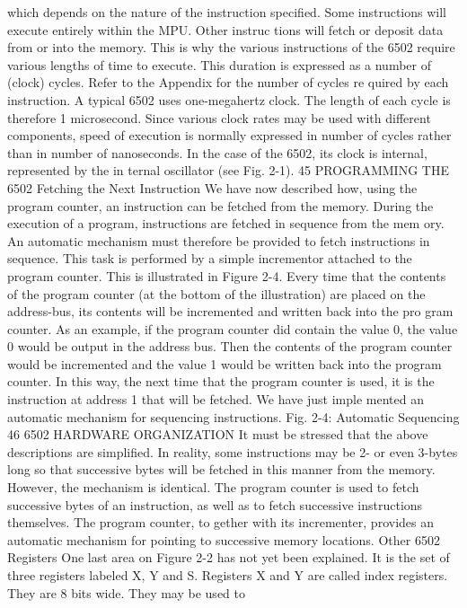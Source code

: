\documentclass{book}
\begin{document}
which depends on the nature of the instruction specified. Some
instructions will execute entirely within the MPU. Other instruc
tions will fetch or deposit data from or into the memory. This is
why the various instructions of the 6502 require various lengths
of time to execute. This duration is expressed as a number of
(clock) cycles. Refer to the Appendix for the number of cycles re
quired by each instruction. A typical 6502 uses one-megahertz
clock. The length of each cycle is therefore 1 microsecond. Since
various clock rates may be used with different components, speed
of execution is normally expressed in number of cycles rather
than in number of nanoseconds.
In the case of the 6502, its clock is internal, represented by the in
ternal oscillator (see Fig. 2-1).
45
PROGRAMMING THE 6502
Fetching the Next Instruction
We have now described how, using the program counter, an
instruction can be fetched from the memory. During the execution
of a program, instructions are fetched in sequence from the mem
ory. An automatic mechanism must therefore be provided to fetch
instructions in sequence. This task is performed by a simple incrementor
attached to the program counter. This is illustrated in
Figure 2-4. Every time that the contents of the program counter
(at the bottom of the illustration) are placed on the address-bus,
its contents will be incremented and written back into the pro
gram counter. As an example, if the program counter did contain
the value 0, the value 0 would be output in the address bus. Then
the contents of the program counter would be incremented and
the value 1 would be written back into the program counter. In
this way, the next time that the program counter is used, it is the
instruction at address 1 that will be fetched. We have just imple
mented an automatic mechanism for sequencing instructions.
Fig. 2-4: Automatic Sequencing
46
6502 HARDWARE ORGANIZATION
It must be stressed that the above descriptions are simplified.
In reality, some instructions may be 2- or even 3-bytes long so that
successive bytes will be fetched in this manner from the memory.
However, the mechanism is identical. The program counter is
used to fetch successive bytes of an instruction, as well as to fetch
successive instructions themselves. The program counter, to
gether with its incrementer, provides an automatic mechanism
for pointing to successive memory locations.
Other 6502 Registers
One last area on Figure 2-2 has not yet been explained. It is the
set of three registers labeled X, Y and S. Registers X and Y are
called index registers. They are 8 bits wide. They may be used to
\end{document}
